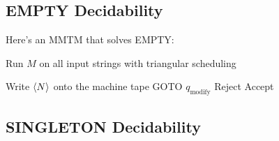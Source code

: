 \documentclass[12pt]{article}
\begin{document}
\subsection{EMPTY Decidability}

Here's an MMTM that solves EMPTY:
\begin{algorithmic}[1]
            \State Run $M$ on all input strings with triangular scheduling
                \State \Return
            \Else
            \EndIf
        \EndProcedure

        \item[]
        \State Write $\Braket{N}$ onto the machine tape
        \State GOTO $q_{\text{modify}}$
            \State Reject
            \State Accept
        \EndIf
    \EndProcedure
\end{algorithmic}

\pagebreak

\subsection{SINGLETON Decidability}\label{sec:singleton}
\end{document}

